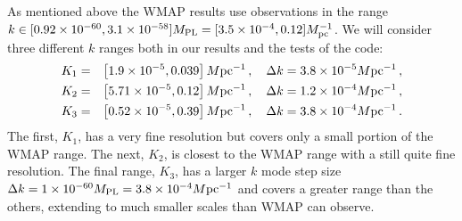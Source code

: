 As mentioned above the WMAP results \cite{Komatsu:2008hk} use
observations in the range $k\in [0.92 \times 10^{-60}, 3.1 \times
  10^{-58}]M_{\mathrm{PL}} = [3.5\times 10^{-4}, 0.12] M_{\mathrm{pc}}^{-1}$. We will
consider three different $k$ ranges both in our results and the tests
of the code\footnotemark:
%
\begin{eqnarray}
\label{eq:Krangedefns}
K_1 &=& \left[1.9\times 10^{-5}, 0.039\right]M \mathrm{pc}^{-1}\,,\quad \Delta k = 3.8\times 10^{-5}M \mathrm{pc}^{-1}
\,,\nonumber\\
K_2 &=& \left[5.71\times 10^{-5}, 0.12\right]M \mathrm{pc}^{-1}\,, \quad \Delta k = 1.2\times 10^{-4}M \mathrm{pc}^{-1}\,,
\nonumber\\ 
K_3 &=& \left[0.52\times 10^{-5}, 0.39\right]M \mathrm{pc}^{-1}\,, \quad \Delta k = 3.8\times 10^{-4}M \mathrm{pc}^{-1} \,.
\end{eqnarray}
% 
% 
The first, $K_1$, has a very fine resolution but covers only a small portion of the WMAP range. 
The next, $K_2$, is closest to the WMAP range with a still quite fine resolution.  The final
range, $K_3$, has a larger $k$ mode step size $\Delta k = 1\times 10^{-60}M_{\mathrm{PL}} = 3.8\times 10^{-4}M \mathrm{pc}^{-1}$ and
covers a greater range than the others, extending to much smaller scales than WMAP can observe.

